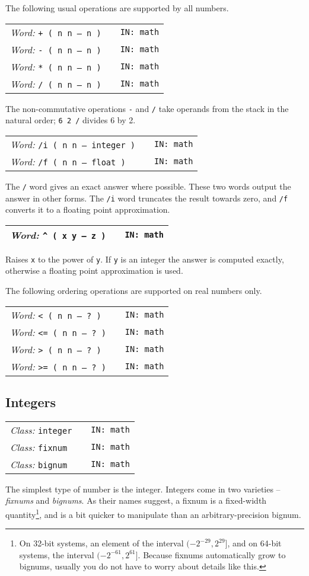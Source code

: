 \documentclass{report}
\newcommand{\ordinaryword}[3]{\index{#1}
\emph{Word:} \texttt{#2} &&\texttt{IN: #3}}
\newcommand{\classword}[2]{\index{#1}
\emph{Class:} \texttt{#1} &&\texttt{IN: #2}}
\newcommand{\wordtable}[1]{

\begin{tabularx}{12cm}[t]{lXr}
\hline
#1\\
\hline
\end{tabularx}

}
\begin{document}
The following usual operations are supported by all numbers.

\wordtable{
\ordinaryword{+}{+ ( n n -- n )}{math}\\
\ordinaryword{-}{- ( n n -- n )}{math}\\
\ordinaryword{*}{* ( n n -- n )}{math}\\
\ordinaryword{/}{/ ( n n -- n )}{math}
}
The non-commutative operations \texttt{-} and \texttt{/} take operands from the stack in the natural order; \texttt{6 2 /} divides 6 by 2.

\wordtable{
\ordinaryword{/i}{/i ( n n -- integer )}{math}\\
\ordinaryword{/f}{/f ( n n -- float )}{math}
}
The \texttt{/} word gives an exact answer where possible. These two words output the answer in other forms. The \texttt{/i} word truncates the result towards zero, and \texttt{/f} converts it to a floating point approximation.
\wordtable{
\ordinaryword{\^}{\^{} ( x y -- z )}{math}
}
Raises \texttt{x} to the power of \texttt{y}. If \texttt{y} is an integer the answer is computed exactly, otherwise a floating point approximation is used.

The following ordering operations are supported on real numbers only.

\wordtable{
\ordinaryword{<}{< ( n n -- ?~)}{math}\\
\ordinaryword{<=}{<= ( n n -- ?~)}{math}\\
\ordinaryword{>}{> ( n n -- ?~)}{math}\\
\ordinaryword{>=}{>= ( n n -- ?~)}{math}
}

\subsection{\label{integers}Integers}

\integerglos

\wordtable{
\classword{integer}{math}\\
\classword{fixnum}{math}\\
\classword{bignum}{math}
}
The simplest type of number is the integer. Integers come in two varieties -- \emph{fixnums} and \emph{bignums}. As their names suggest, a fixnum is a fixed-width quantity\footnote{On 32-bit systems, an element of the interval $(-2^{-29},2^{29}]$, and on 64-bit systems, the interval $(-2^{-61},2^{61}]$. Because fixnums automatically grow to bignums, usually you do not have to worry about details like this.}, and is a bit quicker to manipulate than an arbitrary-precision bignum.
\end{document}
